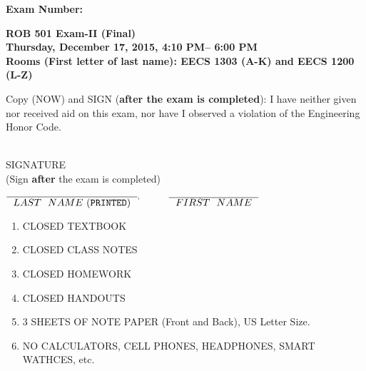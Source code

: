 \documentclass[letterpaper]{article}
\newcommand{\bline}[1]{\underline{\hspace*{#1}}}
\begin{document}

\begin{flushright}
{\bf Exam Number:}\bline{0.6in}
\end{flushright}

\vspace*{.1in}
\begin{center}
\LARGE \bf
ROB 501 Exam-II (Final)\\
\large
Thursday, December 17, 2015, 4:10 PM-- 6:00 PM \\
Rooms (First letter of last name): EECS 1303 (A-K) and EECS 1200 (L-Z) \\
\end{center}

\vspace*{1in}

 Copy (NOW) and SIGN ({\bf after the exam is completed}): I have neither given nor received aid on this exam, nor have I observed a violation of the
Engineering Honor Code.

\vspace*{1in}
\begin{flushright}
\underline{\hspace*{2.5in}} \\
SIGNATURE \\
(Sign {\bf after} the exam is completed)
\end{flushright}

\vspace*{1in}

\begin{center}
$\overline{\mathrm ~~LAST~~NAME~ ({\tt PRINTED})~~}^, \hspace*{.4in} \overline{\mathrm ~~FIRST~~NAME~~}$ \\

\end{center}

\vspace*{.45in} 
\begin{enumerate}
\item CLOSED TEXTBOOK
\item CLOSED CLASS NOTES
\item CLOSED HOMEWORK
\item CLOSED HANDOUTS
\item 3 SHEETS OF NOTE PAPER (Front and Back), US Letter Size.
\item NO CALCULATORS, CELL PHONES, HEADPHONES, SMART WATHCES, etc.
\end{enumerate}
\vspace*{.4in}
\end{document}

